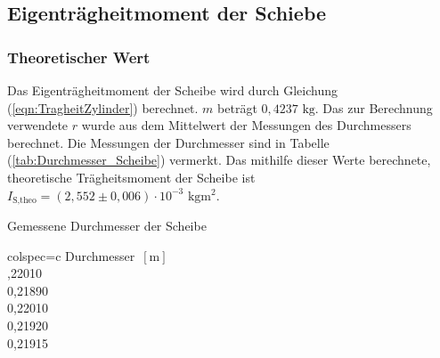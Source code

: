   \subsection{Eigenträgheitmoment der Schiebe}
    \subsubsection{Theoretischer Wert}
    Das Eigenträgheitmoment der Scheibe wird durch Gleichung (\ref{eqn:TragheitZylinder}) berechnet. $m$ beträgt $0,4237 \,\,\unit{\kilo\gram}$.
    Das zur Berechnung verwendete $r$ wurde aus dem Mittelwert der Messungen des Durchmessers berechnet. 
    Die Messungen der Durchmesser sind in Tabelle (\ref{tab:Durchmesser_Scheibe}) vermerkt. Das mithilfe dieser Werte berechnete, theoretische 
    Trägheitsmoment der Scheibe ist $I_{\text{S,theo}} = (2,552 \pm 0,006) \cdot 10^{-3} \,\,\unit{\kilo\gram\meter\squared}$. 
    \begin{table}[H]
      \centering 
      \caption{Gemessene Durchmesser der Scheibe}
      \label{tab:Durchmesser_Scheibe}
      \begin{tblr}{colspec={c}}
          \toprule
          Durchmesser $\,[\unit{\meter}]$ \\
          ,22010 \\
          0,21890 \\
          0,22010 \\
          0,21920 \\
          0,21915 \\
          \bottomrule
      \end{tblr}
    \end{table}
